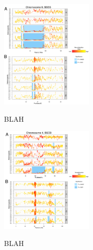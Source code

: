 \begin{figure}[tb]   
  \begin{center}
   \vspace{-0mm}
   \includegraphics[width=0.4\textwidth]{fig4}
   \renewcommand{\baselinestretch}{0.9}
   \vspace{-3mm}
   \caption{BLAH} 
\vspace{-6mm}
    \label{fig:genphys}
  \end{center}
\end{figure}

\begin{figure}[tb]   
  \begin{center}
   \vspace{-0mm}
   \includegraphics[width=0.4\textwidth]{fig5}
   \renewcommand{\baselinestretch}{0.9}
   \vspace{-3mm}
   \caption{BLAH} 
\vspace{-6mm}
    \label{fig:genphys2}
  \end{center}
\end{figure}
